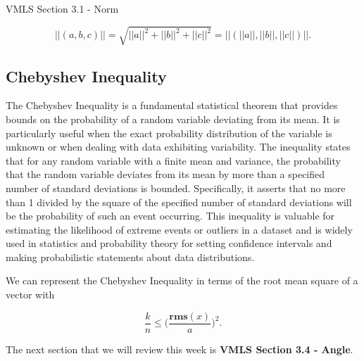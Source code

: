\begin{notes}{VMLS Section 3.1 - Norm}
\begin{Highlight}
        \begin{equation*}
            ||(a,b,c)|| = \sqrt{||a||^{2} + ||b||^{2} + ||c||^{2}} = ||(||a||,||b||,||c||)||.
        \end{equation*}
    \end{Highlight}


    \subsection*{Chebyshev Inequality}

    The Chebyshev Inequality is a fundamental statistical theorem that provides bounds on the probability of a random variable deviating from its mean. It is particularly useful when the exact probability distribution 
    of the variable is unknown or when dealing with data exhibiting variability. The inequality states that for any random variable with a finite mean and variance, the probability that the random variable deviates from 
    its mean by more than a specified number of standard deviations is bounded. Specifically, it asserts that no more than 1 divided by the square of the specified number of standard deviations will be the probability 
    of such an event occurring. This inequality is valuable for estimating the likelihood of extreme events or outliers in a dataset and is widely used in statistics and probability theory for setting confidence intervals 
    and making probabilistic statements about data distributions.

    \begin{Highlight}
        We can represent the Chebyshev Inequality in terms of the root mean square of a vector with

        \begin{equation*}
            \frac{k}{n} \leq \Bigg(\frac{\mathbf{rms}(x)}{a}\Bigg)^{2}.
        \end{equation*}
    \end{Highlight}
\end{notes}

The next section that we will review this week is \textbf{VMLS Section 3.4 - Angle}.

